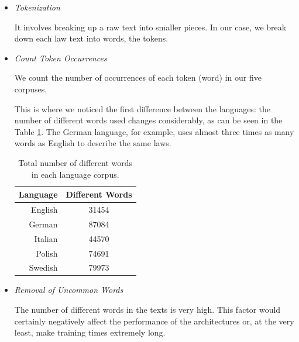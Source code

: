 \documentclass[letterpaper,11pt]{article}
\begin{document}
\begin{itemize}
  \item \textit{Tokenization}
  
  It involves breaking up a raw text into smaller pieces. In our case, we break down each law text into words, the tokens. 

  \item \textit{Count Token Occurrences}
  
  We count the number of occurrences of each token (word) in our five corpuses.

  This is where we noticed the first difference between the languages: the number of different words used changes considerably, as can be seen in the Table \ref{table:tot_words_for_corpuses}. The German language, for example, uses almost three times as many words as English to describe the same laws.

  \begin{table}[H]
    \centering
    \begin{tabular}{|r|c|}
    \hline
    \multicolumn{1}{|c|}{\textbf{Language}} & \multicolumn{1}{c|}{\textbf{Different Words}} \\ \hline
    English                                 & 31454                                                            \\ \hline
    German                                  & 87084                                                            \\ \hline
    Italian                                 & 44570                                                            \\ \hline
    Polish                                  & 74691                                                            \\ \hline
    Swedish                                 & 79973                                                            \\ \hline
    \end{tabular}
    \caption{Total number of different words in each language corpus.}
    \label{table:tot_words_for_corpuses}
  \end{table}


  \item \textit{Removal of Uncommon Words}
  
  The number of different words in the texts is very high. This factor would certainly negatively affect the performance of the architectures or, at the very least, make training times extremely long. 
  

\end{itemize}
\end{document}
